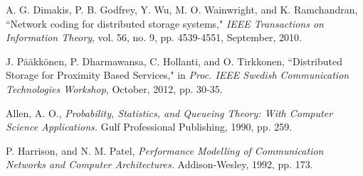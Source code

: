 \documentclass[10pt,conference]{IEEEtran}
\begin{document}
\begin{thebibliography}{1}
A. G. Dimakis, P. B. Godfrey, Y. Wu, M. O. Wainwright, and K. Ramchandran, ``Network coding for distributed storage systems,"
\emph{IEEE Transactions on Information Theory}, vol. 56, no. 9, pp. 4539-4551, September, 2010.

J. P\"a\"akk\"onen, P. Dharmawansa, C. Hollanti, and O. Tirkkonen, ``Distributed Storage for Proximity Based Services,"
in \emph{Proc. IEEE Swedish Communication Technologies Workshop}, October, 2012, pp. 30-35.

Allen, A. O., \emph{Probability, Statistics, and Queueing Theory: With Computer Science Applications.} Gulf Professional Publishing, 1990, pp. 259.

P. Harrison, and N. M. Patel, \emph{Performance Modelling of Communication Networks and Computer Architectures.} Addison-Wesley, 1992, pp. 173.

\end{thebibliography}
\end{document}
